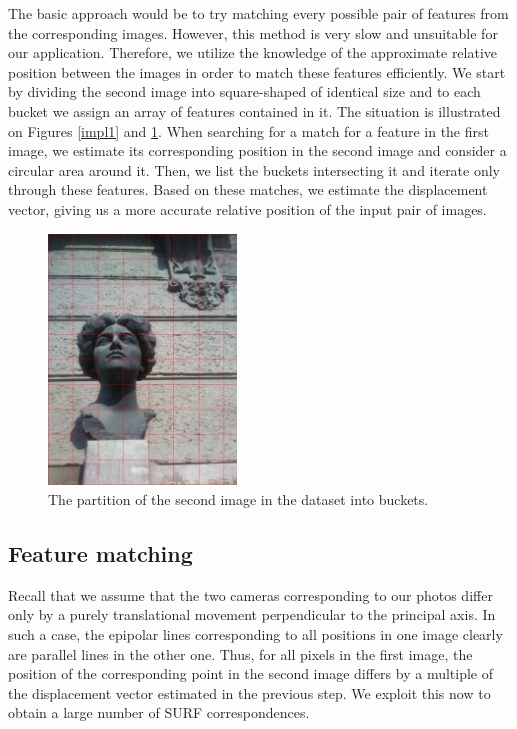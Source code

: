The basic approach would be to try matching every possible pair of features from the corresponding images. 
However, this method is very slow and unsuitable for our application. 
Therefore, we utilize the knowledge of the approximate relative position between the images in order to match these features efficiently.
We start by dividing the second image into square-shaped  of identical size and to each bucket we assign an array of features contained in it.
The situation is illustrated on Figures \ref{impl1} and \ref{emabuckets}.
When searching for a match for a feature in the first image, we estimate its corresponding position in the second image and consider a circular area around it. 
Then, we list the buckets intersecting it and iterate only through these features. 
Based on these matches, we estimate the displacement vector, giving us a more accurate relative position of the input pair of images.

\begin{figure}[h]
\centering
\includegraphics[width=5cm]{img/ema_buckets.png}
\caption{The partition of the second image in the dataset into buckets.}
\label{emabuckets}
\end{figure} 


\subsection{Feature matching}
\label{sec:matching}

Recall that we assume that the two cameras corresponding to our photos differ only by a purely translational movement perpendicular to the principal axis.
In such a case, the epipolar lines corresponding to all positions in one image clearly are parallel lines in the other one. 
Thus, for all pixels in the first image, the position of the corresponding point in the second image differs by a multiple of the displacement vector estimated in the previous step. 
We exploit this now to obtain a large number of SURF correspondences. 

